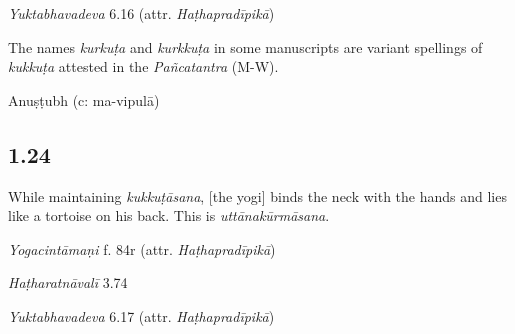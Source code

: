 \begin{ekdosis}
\begin{testimonia}[hp01_023]
\emph{Yuktabhavadeva} 6.16 (attr. \emph{Haṭhapradīpikā})

\begin{versinnote}
\end{versinnote}


\end{testimonia}

\begin{philcomm}[hp01_023]
The names \emph{kurkuṭa} and \emph{kurkkuṭa} in some manuscripts are variant spellings of \emph{kukkuṭa} attested in the \emph{Pañcatantra} (M-W).
\end{philcomm}

\begin{metre}[hp01_023]
Anuṣṭubh (c: ma-vipulā)
\end{metre}

\subsection*{1.24}
\begin{translation}[hp01_024]
While maintaining \emph{kukkuṭāsana}, [the yogi] binds the neck with the hands and lies like a tortoise on his back. This is \emph{uttānakūrmāsana}.
\end{translation}

\begin{testimonia}[hp01_024]
\emph{Yogacintāmaṇi} f. 84r (attr. \emph{Haṭhapradīpikā})

\begin{versinnote}
\end{versinnote}

\emph{Haṭharatnāvalī} 3.74

\begin{versinnote}
\end{versinnote}

\emph{Yuktabhavadeva} 6.17 (attr. \emph{Haṭhapradīpikā})


\end{testimonia}
\end{ekdosis}
